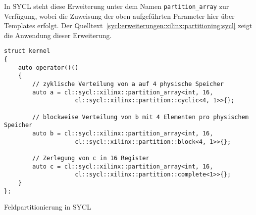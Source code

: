In SYCL steht diese Erweiterung unter dem Namen \texttt{partition\_array} zur
Verfügung, wobei die Zuweisung der oben aufgeführten Parameter hier über
Templates erfolgt. Der
Quelltext~\ref{sycl:erweiterungen:xilinx:partitioning:sycl} zeigt die Anwendung
dieser Erweiterung.

\begin{code}
    \begin{verbatim}
struct kernel
{
    auto operator()()
    {
        // zyklische Verteilung von a auf 4 physische Speicher
        auto a = cl::sycl::xilinx::partition_array<int, 16,
                    cl::sycl::xilinx::partition::cyclic<4, 1>>{};

        // blockweise Verteilung von b mit 4 Elementen pro physischem Speicher
        auto b = cl::sycl::xilinx::partition_array<int, 16,
                    cl::sycl::xilinx::partition::block<4, 1>>{};

        // Zerlegung von c in 16 Register
        auto c = cl::sycl::xilinx::partition_array<int, 16,
                    cl::sycl::xilinx::partition::complete<1>>{};
    }
};
    \end{verbatim}
    \caption{Feldpartitionierung in SYCL}
    \label{sycl:erweiterungen:xilinx:partitioning:sycl}
\end{code}

